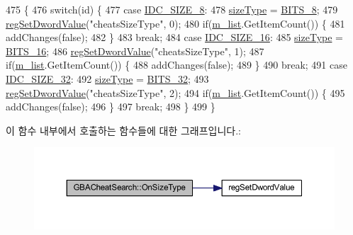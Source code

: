 \begin{DoxyCode}
475 \{
476   \textcolor{keywordflow}{switch}(\textcolor{keywordtype}{id}) \{
477   \textcolor{keywordflow}{case} \mbox{\hyperlink{resource_8h_aabec7e8ec4648288db9ff8c10fdf3bb7}{IDC\_SIZE\_8}}:
478     \mbox{\hyperlink{class_g_b_a_cheat_search_a9fc543b94f045d8c778cf921c06cc2c3}{sizeType}} = \mbox{\hyperlink{_cheat_search_8h_adf764cbdea00d65edcd07bb9953ad2b7af0816abbef0501e93cc698ee906d1fcc}{BITS\_8}};
479     \mbox{\hyperlink{_reg_8cpp_a758e775489a3fb5c3cc7071fdd5af87e}{regSetDwordValue}}(\textcolor{stringliteral}{"cheatsSizeType"}, 0);
480     \textcolor{keywordflow}{if}(\mbox{\hyperlink{class_g_b_a_cheat_search_aab4be5c0e3c3436c738a43f466be0902}{m\_list}}.GetItemCount()) \{
481       addChanges(\textcolor{keyword}{false});
482     \}
483     \textcolor{keywordflow}{break};
484   \textcolor{keywordflow}{case} \mbox{\hyperlink{resource_8h_a3b1ce25b145995e8af592b0a80b8e564}{IDC\_SIZE\_16}}:
485     \mbox{\hyperlink{class_g_b_a_cheat_search_a9fc543b94f045d8c778cf921c06cc2c3}{sizeType}} = \mbox{\hyperlink{_cheat_search_8h_adf764cbdea00d65edcd07bb9953ad2b7abb0eee326b181eb02d5c284fc424ffeb}{BITS\_16}};
486     \mbox{\hyperlink{_reg_8cpp_a758e775489a3fb5c3cc7071fdd5af87e}{regSetDwordValue}}(\textcolor{stringliteral}{"cheatsSizeType"}, 1);
487     \textcolor{keywordflow}{if}(\mbox{\hyperlink{class_g_b_a_cheat_search_aab4be5c0e3c3436c738a43f466be0902}{m\_list}}.GetItemCount()) \{
488       addChanges(\textcolor{keyword}{false});
489     \}
490     \textcolor{keywordflow}{break};
491   \textcolor{keywordflow}{case} \mbox{\hyperlink{resource_8h_a2d7fa8cb0d3104b26a76be5ab586ff5a}{IDC\_SIZE\_32}}:
492     \mbox{\hyperlink{class_g_b_a_cheat_search_a9fc543b94f045d8c778cf921c06cc2c3}{sizeType}} = \mbox{\hyperlink{_cheat_search_8h_adf764cbdea00d65edcd07bb9953ad2b7aa9302713d54f2f027fa92a747c80c91a}{BITS\_32}};
493     \mbox{\hyperlink{_reg_8cpp_a758e775489a3fb5c3cc7071fdd5af87e}{regSetDwordValue}}(\textcolor{stringliteral}{"cheatsSizeType"}, 2);
494     \textcolor{keywordflow}{if}(\mbox{\hyperlink{class_g_b_a_cheat_search_aab4be5c0e3c3436c738a43f466be0902}{m\_list}}.GetItemCount()) \{
495       addChanges(\textcolor{keyword}{false});
496     \}
497     \textcolor{keywordflow}{break};
498   \}
499 \}
\end{DoxyCode}
이 함수 내부에서 호출하는 함수들에 대한 그래프입니다.\+:
\nopagebreak
\begin{figure}[H]
\begin{center}
\leavevmode
\includegraphics[width=350pt]{class_g_b_a_cheat_search_a3a8aab04dae339242636eaa50b5c3bff_cgraph}
\end{center}
\end{figure}
